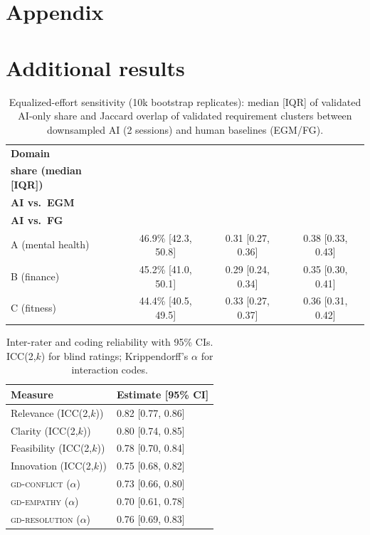 \documentclass[acmsmall]{acmart}
\begin{document}
\section{Appendix}
\appendix
\section{Additional results}
\begin{table}[h!]
  \centering
  \caption{Equalized-effort sensitivity (10k bootstrap replicates): median [IQR] of validated AI-only share and Jaccard overlap of validated requirement clusters between downsampled AI (2 sessions) and human baselines (EGM/FG).}
  \label{tab:equalized}
  \small
  \setlength{\tabcolsep}{5.5pt}
  \begin{tabular}{@{}lccc@{}}
    \toprule
    \textbf{Domain} & \makecell{\textbf{AI-only validated}\\\textbf{share (median [IQR])}} & \makecell{\textbf{Jaccard}\\\textbf{AI vs.\ EGM}} & \makecell{\textbf{Jaccard}\\\textbf{AI vs.\ FG}} \\
    \midrule
    A (mental health) & 46.9\% [42.3, 50.8] & 0.31 [0.27, 0.36] & 0.38 [0.33, 0.43] \\
    B (finance)       & 45.2\% [41.0, 50.1] & 0.29 [0.24, 0.34] & 0.35 [0.30, 0.41] \\
    C (fitness)       & 44.4\% [40.5, 49.5] & 0.33 [0.27, 0.37] & 0.36 [0.31, 0.42] \\
    \bottomrule
  \end{tabular}
\end{table}


\begin{table}[h!]
  \centering
  \caption{Inter-rater and coding reliability with 95\% CIs. ICC(2,$k$) for blind ratings; Krippendorff’s $\alpha$ for interaction codes.}
  \label{tab:reliability}
  \small
  \begin{tabular}{@{}l l@{}}
    \toprule
    \textbf{Measure} & \textbf{Estimate [95\% CI]} \\
    \midrule
    Relevance (ICC(2,$k$))  & 0.82 [0.77, 0.86] \\
    Clarity (ICC(2,$k$))    & 0.80 [0.74, 0.85] \\
    Feasibility (ICC(2,$k$))& 0.78 [0.70, 0.84] \\
    Innovation (ICC(2,$k$)) & 0.75 [0.68, 0.82] \\
    \midrule
    \textsc{gd-conflict} ($\alpha$)   & 0.73 [0.66, 0.80] \\
    \textsc{gd-empathy} ($\alpha$)    & 0.70 [0.61, 0.78] \\
    \textsc{gd-resolution} ($\alpha$) & 0.76 [0.69, 0.83] \\
    \bottomrule
  \end{tabular}
\end{table}
\end{document}
